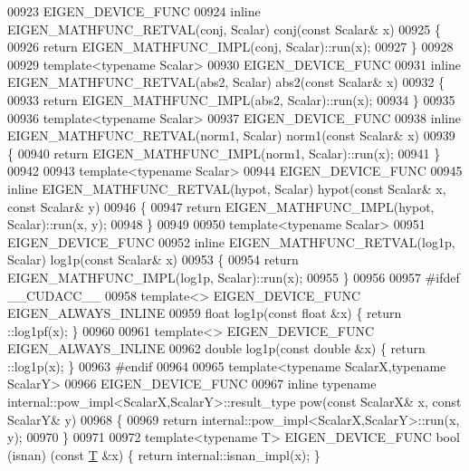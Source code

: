\begin{DoxyCode}
00923 EIGEN\_DEVICE\_FUNC
00924 \textcolor{keyword}{inline} EIGEN\_MATHFUNC\_RETVAL(conj, Scalar) conj(\textcolor{keyword}{const} Scalar& x)
00925 \{
00926   \textcolor{keywordflow}{return} EIGEN\_MATHFUNC\_IMPL(conj, Scalar)::run(x);
00927 \}
00928 
00929 \textcolor{keyword}{template}<\textcolor{keyword}{typename} Scalar>
00930 EIGEN\_DEVICE\_FUNC
00931 \textcolor{keyword}{inline} EIGEN\_MATHFUNC\_RETVAL(abs2, Scalar) abs2(\textcolor{keyword}{const} Scalar& x)
00932 \{
00933   \textcolor{keywordflow}{return} EIGEN\_MATHFUNC\_IMPL(abs2, Scalar)::run(x);
00934 \}
00935 
00936 \textcolor{keyword}{template}<\textcolor{keyword}{typename} Scalar>
00937 EIGEN\_DEVICE\_FUNC
00938 \textcolor{keyword}{inline} EIGEN\_MATHFUNC\_RETVAL(norm1, Scalar) norm1(\textcolor{keyword}{const} Scalar& x)
00939 \{
00940   \textcolor{keywordflow}{return} EIGEN\_MATHFUNC\_IMPL(norm1, Scalar)::run(x);
00941 \}
00942 
00943 \textcolor{keyword}{template}<\textcolor{keyword}{typename} Scalar>
00944 EIGEN\_DEVICE\_FUNC
00945 \textcolor{keyword}{inline} EIGEN\_MATHFUNC\_RETVAL(hypot, Scalar) hypot(\textcolor{keyword}{const} Scalar& x, \textcolor{keyword}{const} Scalar& y)
00946 \{
00947   \textcolor{keywordflow}{return} EIGEN\_MATHFUNC\_IMPL(hypot, Scalar)::run(x, y);
00948 \}
00949 
00950 \textcolor{keyword}{template}<\textcolor{keyword}{typename} Scalar>
00951 EIGEN\_DEVICE\_FUNC
00952 \textcolor{keyword}{inline} EIGEN\_MATHFUNC\_RETVAL(log1p, Scalar) log1p(\textcolor{keyword}{const} Scalar& x)
00953 \{
00954   \textcolor{keywordflow}{return} EIGEN\_MATHFUNC\_IMPL(log1p, Scalar)::run(x);
00955 \}
00956 
00957 \textcolor{preprocessor}{#ifdef \_\_CUDACC\_\_}
00958 \textcolor{keyword}{template}<> EIGEN\_DEVICE\_FUNC EIGEN\_ALWAYS\_INLINE
00959 \textcolor{keywordtype}{float} log1p(\textcolor{keyword}{const} \textcolor{keywordtype}{float} &x) \{ return ::log1pf(x); \}
00960 
00961 \textcolor{keyword}{template}<> EIGEN\_DEVICE\_FUNC EIGEN\_ALWAYS\_INLINE
00962 \textcolor{keywordtype}{double} log1p(\textcolor{keyword}{const} \textcolor{keywordtype}{double} &x) \{ return ::log1p(x); \}
00963 \textcolor{preprocessor}{#endif}
00964 
00965 \textcolor{keyword}{template}<\textcolor{keyword}{typename} ScalarX,\textcolor{keyword}{typename} ScalarY>
00966 EIGEN\_DEVICE\_FUNC
00967 \textcolor{keyword}{inline} \textcolor{keyword}{typename} internal::pow\_impl<ScalarX,ScalarY>::result\_type pow(\textcolor{keyword}{const} ScalarX& x, \textcolor{keyword}{const} ScalarY& y)
00968 \{
00969   \textcolor{keywordflow}{return} internal::pow\_impl<ScalarX,ScalarY>::run(x, y);
00970 \}
00971 
00972 \textcolor{keyword}{template}<\textcolor{keyword}{typename} T> EIGEN\_DEVICE\_FUNC bool (isnan)   (\textcolor{keyword}{const} \hyperlink{group___sparse_core___module_class_eigen_1_1_triplet}{T} &x) \{ \textcolor{keywordflow}{return} internal::isnan\_impl(x); \}

\end{DoxyCode}
